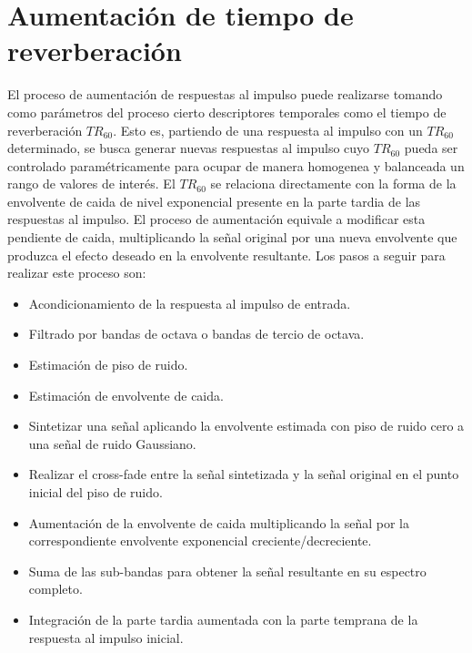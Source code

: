 \section{Aumentación de tiempo de reverberación}
El proceso de aumentación de respuestas al impulso puede realizarse tomando como parámetros del proceso cierto descriptores temporales como el tiempo de reverberación $TR_{60}$. Esto es, partiendo de una respuesta al impulso con un $TR_{60}$ determinado, se busca generar nuevas respuestas al impulso cuyo $TR_{60}$ pueda ser controlado paramétricamente para ocupar de manera homogenea y balanceada un rango de valores de interés. 
El $TR_{60}$ se relaciona directamente con la forma de la envolvente de caida de nivel exponencial presente en la parte tardia de las respuestas al impulso. El proceso de aumentación equivale a modificar esta pendiente de caida, multiplicando la señal original por una nueva envolvente que produzca el efecto deseado en la envolvente resultante. Los pasos a seguir para realizar este proceso son: 

\begin{itemize}
  \item Acondicionamiento de la respuesta al impulso de entrada.
  \item Filtrado por bandas de octava o bandas de tercio de octava.
  \item Estimación de piso de ruido.
  \item Estimación de envolvente de caida.
  \item Sintetizar una señal aplicando la envolvente estimada con piso de ruido cero a una señal de ruido Gaussiano. 
  \item Realizar el cross-fade entre la señal sintetizada y la señal original en el punto inicial del piso de ruido.
  \item Aumentación de la envolvente de caida multiplicando la señal por la correspondiente envolvente exponencial creciente/decreciente.
  \item Suma de las sub-bandas para obtener la señal resultante en su espectro completo.
  \item Integración de la parte tardia aumentada con la parte temprana de la respuesta al impulso inicial.
\end{itemize} 	

